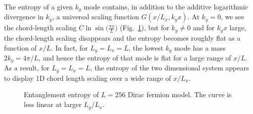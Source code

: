 \documentclass[prl,aps,twocolumn,floatfix,amsmath,amssymb,superscriptaddress,tightenlines]{revtex4}
\begin{document}
The entropy of a given $k_y$ mode contains, in addition to the additive logarithmic divergence in $k_y$, a universal scaling function $G(x/L_x,k_y x)$.  At $k_y=0$, we see the chord-length scaling $C \ln\sin\big( \frac{\pi x}{L} \big)$ (Fig.~\ref{fig:dirac}), but for $k_y \neq 0$ and for $k_y x$ large, the chord-length scaling disappears and the entropy becomes roughly flat as a function of $x/L$.  In fact, for $L_y=L_x=L$, the lowest $k_y$ mode has a mass $2 k_y=4\pi/L$, and hence the entropy of that mode is flat for a large range of $x/L$.  As a result, for $L_y=L_x=L$, the entropy of the two dimensional system appears to display 1D chord length scaling over a wide range of $x/L_x$.

 \begin{figure}
   \begin{center}
   \end{center}
   \caption{Entanglement entropy of $L=256$ Dirac fermion model. The curve is less linear at larger $L_y/L_x$.}
   \label{fig:dirac}
 \end{figure}
 
\end{document}
